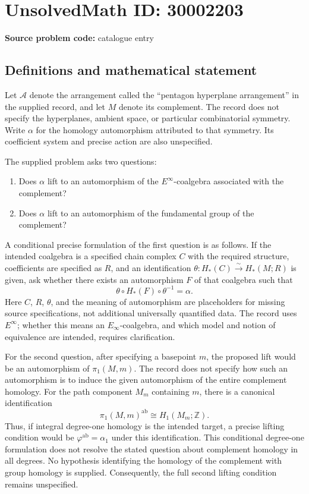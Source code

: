 \documentclass[11pt]{article}
\newcommand{\Z}{\mathbb{Z}}
\begin{document}
\section*{UnsolvedMath ID: 30002203}
\textbf{Source problem code:} catalogue entry
\subsection{Definitions and mathematical statement}
Let \(\mathcal A\) denote the arrangement called the ``pentagon hyperplane arrangement'' in the supplied record, and let \(M\) denote its complement. The record does not specify the hyperplanes, ambient space, or particular combinatorial symmetry. Write \(\alpha\) for the homology automorphism attributed to that symmetry. Its coefficient system and precise action are also unspecified.

The supplied problem asks two questions:
\begin{enumerate}
\item Does \(\alpha\) lift to an automorphism of the \(E^{\infty}\)-coalgebra associated with the complement?
\item Does \(\alpha\) lift to an automorphism of the fundamental group of the complement?
\end{enumerate}

A conditional precise formulation of the first question is as follows. If the intended coalgebra is a specified chain complex \(C\) with the required structure, coefficients are specified as \(R\), and an identification \(\theta\colon H_*(C)\xrightarrow{\sim}H_*(M;R)\) is given, ask whether there exists an automorphism \(F\) of that coalgebra such that
\[
\theta\circ H_*(F)\circ\theta^{-1}=\alpha.
\]
Here \(C\), \(R\), \(\theta\), and the meaning of automorphism are placeholders for missing source specifications, not additional universally quantified data. The record uses \(E^{\infty}\); whether this means an \(E_\infty\)-coalgebra, and which model and notion of equivalence are intended, requires clarification.

For the second question, after specifying a basepoint \(m\), the proposed lift would be an automorphism of \(\pi_1(M,m)\). The record does not specify how such an automorphism is to induce the given automorphism of the entire complement homology. For the path component \(M_m\) containing \(m\), there is a canonical identification
\[
\pi_1(M,m)^{\mathrm{ab}}\cong H_1(M_m;\Z).
\]
Thus, if integral degree-one homology is the intended target, a precise lifting condition would be \(\varphi^{\mathrm{ab}}=\alpha_1\) under this identification. This conditional degree-one formulation does not resolve the stated question about complement homology in all degrees. No hypothesis identifying the homology of the complement with group homology is supplied. Consequently, the full second lifting condition remains unspecified.
\end{document}
